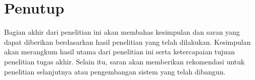 \chapter{Penutup}
\label{chapter:penutup}
Bagian akhir dari penelitian ini akan membahas kesimpulan dan saran yang dapat diberikan berdasarkan hasil penelitian yang telah dilakukan. Kesimpulan akan merangkum hasil utama dari penelitian ini serta ketercapaian tujuan penelitian tugas akhir. Selain itu, saran akan memberikan rekomendasi untuk penelitian selanjutnya atau pengembangan sistem yang telah dibangun.



